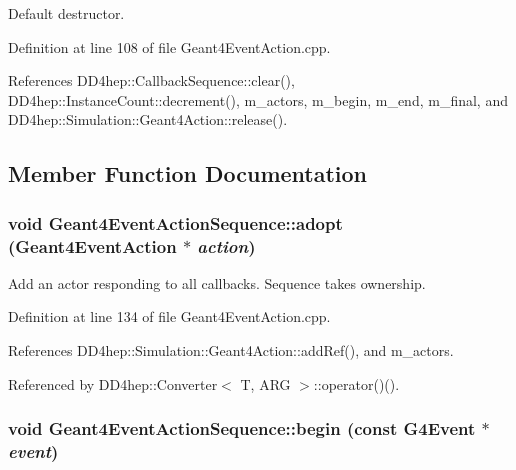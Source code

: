 Default destructor. 

Definition at line 108 of file Geant4EventAction.cpp.

References DD4hep::CallbackSequence::clear(), DD4hep::InstanceCount::decrement(), m\_\-actors, m\_\-begin, m\_\-end, m\_\-final, and DD4hep::Simulation::Geant4Action::release().

\subsection{Member Function Documentation}
\hypertarget{class_d_d4hep_1_1_simulation_1_1_geant4_event_action_sequence_a21013600fd6c11994991e76878fb0896}{
\subsubsection[{adopt}]{\setlength{\rightskip}{0pt plus 5cm}void Geant4EventActionSequence::adopt ({\bf Geant4EventAction} $\ast$ {\em action})}}
\label{class_d_d4hep_1_1_simulation_1_1_geant4_event_action_sequence_a21013600fd6c11994991e76878fb0896}


Add an actor responding to all callbacks. Sequence takes ownership. 

Definition at line 134 of file Geant4EventAction.cpp.

References DD4hep::Simulation::Geant4Action::addRef(), and m\_\-actors.

Referenced by DD4hep::Converter$<$ T, ARG $>$::operator()().\hypertarget{class_d_d4hep_1_1_simulation_1_1_geant4_event_action_sequence_a77375888d2519a2095ded294c540ebec}{
\subsubsection[{begin}]{\setlength{\rightskip}{0pt plus 5cm}void Geant4EventActionSequence::begin (const G4Event $\ast$ {\em event})}}
\label{class_d_d4hep_1_1_simulation_1_1_geant4_event_action_sequence_a77375888d2519a2095ded294c540ebec}


